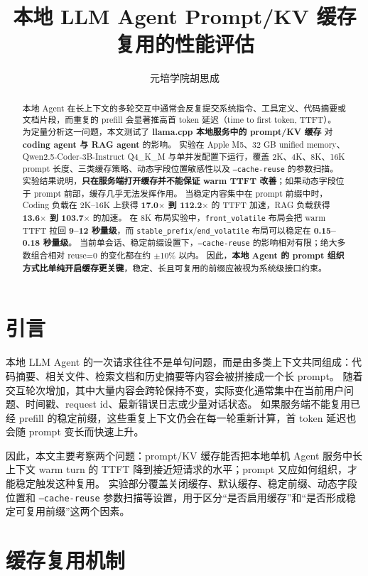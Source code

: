 \documentclass[10pt]{article}
\title{本地 LLM Agent Prompt/KV 缓存复用的性能评估}
\author{%
  元培学院\quad 胡思成\quad2400017832\\
}
\date{}
\begin{document}
\maketitle

\begin{abstract}
本地 Agent 在长上下文的多轮交互中通常会反复提交系统指令、工具定义、代码摘要或文档片段，而重复的 prefill 会显著推高首 token 延迟（time to first token, TTFT）。
为定量分析这一问题，本文测试了 \textbf{llama.cpp 本地服务中的 prompt/KV 缓存} 对 \textbf{coding agent 与 RAG agent} 的影响。
实验在 Apple M5、32 GB unified memory、Qwen2.5-Coder-3B-Instruct Q4\_K\_M 与单并发配置下运行，覆盖 2K、4K、8K、16K prompt 长度、三类缓存策略、动态字段位置敏感性以及 \texttt{--cache-reuse} 的参数扫描。
实验结果说明，\textbf{只在服务端打开缓存并不能保证 warm TTFT 改善}；如果动态字段位于 prompt 前部，缓存几乎无法发挥作用。
当稳定内容集中在 prompt 前缀中时，Coding 负载在 2K--16K 上获得 \textbf{17.0$\times$ 到 112.2$\times$} 的 TTFT 加速，RAG 负载获得 \textbf{13.6$\times$ 到 103.7$\times$} 的加速。
在 8K 布局实验中，\texttt{front\_volatile} 布局会把 warm TTFT 拉回 \textbf{9--12 秒量级}，而 \texttt{stable\_prefix}/\texttt{end\_volatile} 布局可以稳定在 \textbf{0.15--0.18 秒量级}。
当前单会话、稳定前缀设置下，\texttt{--cache-reuse} 的影响相对有限；绝大多数组合相对 reuse=0 的变化都在约 $\pm$10\% 以内。
因此，\textbf{本地 Agent 的 prompt 组织方式比单纯开启缓存更关键}，稳定、长且可复用的前缀应被视为系统级接口约束。
\end{abstract}

\section{引言}
\label{sec:introduction}

本地 LLM Agent 的一次请求往往不是单句问题，而是由多类上下文共同组成：代码摘要、相关文件、检索文档和历史摘要等内容会被拼接成一个长 prompt。
随着交互轮次增加，其中大量内容会跨轮保持不变，实际变化通常集中在当前用户问题、时间戳、request id、最新错误日志或少量对话状态。
如果服务端不能复用已经 prefill 的稳定前缀，这些重复上下文仍会在每一轮重新计算，首 token 延迟也会随 prompt 变长而快速上升。

因此，本文主要考察两个问题：prompt/KV 缓存能否把本地单机 Agent 服务中长上下文 warm turn 的 TTFT 降到接近短请求的水平；prompt 又应如何组织，才能稳定触发这种复用。
实验部分覆盖关闭缓存、默认缓存、稳定前缀、动态字段位置和 \texttt{--cache-reuse} 参数扫描等设置，用于区分“是否启用缓存”和“是否形成稳定可复用前缀”这两个因素。

\section{缓存复用机制}
\label{sec:theory}
\end{document}
